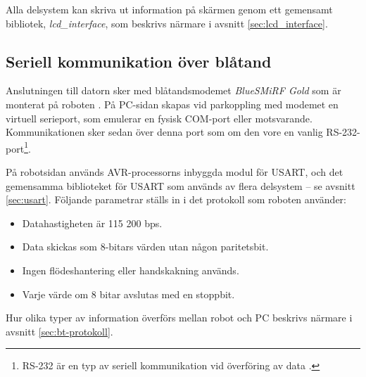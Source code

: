 Alla delsystem kan skriva ut information på skärmen genom ett gemensamt bibliotek, \textit{lcd\_interface}, som beskrivs närmare i avsnitt \ref{sec:lcd_interface}.


\subsection{Seriell kommunikation över blåtand}
Anslutningen till datorn sker med blåtandsmodemet \emph{BlueSMiRF Gold} som är monterat på roboten \cite{bluetooth}. På PC-sidan skapas vid parkoppling med modemet en virtuell serieport, som emulerar en fysisk COM-port eller motsvarande. Kommunikationen sker sedan över denna port som om den vore en vanlig RS-232-port\footnote{RS-232 är en typ av seriell kommunikation vid överföring av data \cite{rs232}.}. 

På robotsidan används AVR-processorns inbyggda modul för USART, och det gemensamma biblioteket för USART som används av flera delsystem -- se avsnitt \ref{sec:usart}. Följande parametrar ställs in i det protokoll som roboten använder:
\begin{itemize}
\item Datahastigheten är 115 200 bps.
\item Data skickas som 8-bitars värden utan någon paritetsbit.
\item Ingen flödeshantering eller handskakning används.
\item Varje värde om 8 bitar avslutas med en stoppbit.
\end{itemize}

Hur olika typer av information överförs mellan robot och PC beskrivs närmare i avsnitt \ref{sec:bt-protokoll}.
